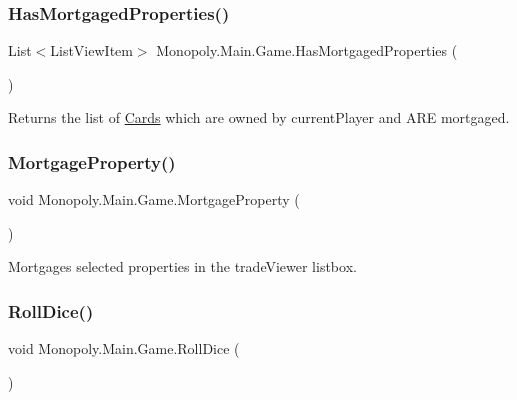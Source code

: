 \subsubsection{\texorpdfstring{Has\+Mortgaged\+Properties()}{HasMortgagedProperties()}}
{\footnotesize\ttfamily List$<$List\+View\+Item$>$ Monopoly.\+Main.\+Game.\+Has\+Mortgaged\+Properties (\begin{DoxyParamCaption}{ }\end{DoxyParamCaption})\hspace{0.3cm}{\ttfamily [inline]}}

Returns the list of \mbox{\hyperlink{namespace_monopoly_1_1_cards}{Cards}} which are owned by current\+Player and A\+RE mortgaged. \mbox{\label{class_monopoly_1_1_main_1_1_game_abd65b1836ea5f425b7c4f911b011f719}} 
\subsubsection{\texorpdfstring{Mortgage\+Property()}{MortgageProperty()}}
{\footnotesize\ttfamily void Monopoly.\+Main.\+Game.\+Mortgage\+Property (\begin{DoxyParamCaption}{ }\end{DoxyParamCaption})\hspace{0.3cm}{\ttfamily [inline]}}

Mortgages selected properties in the trade\+Viewer listbox. \mbox{\label{class_monopoly_1_1_main_1_1_game_a8db7b2f4e7f53446d3af3312545eb5ee}} 
\subsubsection{\texorpdfstring{Roll\+Dice()}{RollDice()}}
{\footnotesize\ttfamily void Monopoly.\+Main.\+Game.\+Roll\+Dice (\begin{DoxyParamCaption}{ }\end{DoxyParamCaption})\hspace{0.3cm}{\ttfamily [inline]}}

